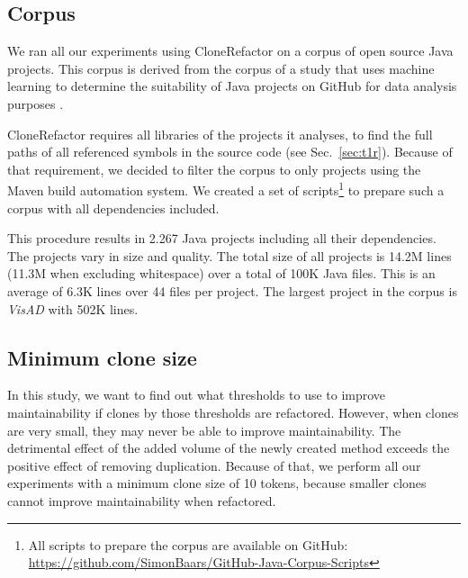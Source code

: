 \documentclass[sigconf,review, table]{acmart}
\begin{document}
\subsection{Corpus}
We ran all our experiments using CloneRefactor on a corpus of open source Java projects. This corpus is derived from the corpus of a study that uses machine learning to determine the suitability of Java projects on GitHub for data analysis purposes \cite{githubCorpus2013}.

CloneRefactor requires all libraries of the projects it analyses, to find the full paths of all referenced symbols in the source code (see Sec.~\ref{sec:t1r}). Because of that requirement, we decided to filter the corpus to only projects using the Maven build automation system. We created a set of scripts\footnote{All scripts to prepare the corpus are available on GitHub: \url{https://github.com/SimonBaars/GitHub-Java-Corpus-Scripts}} to prepare such a corpus with all dependencies included.

This procedure results in 2.267 Java projects including all their dependencies. The projects vary in size and quality. The total size of all projects is 14.2M lines (11.3M when excluding whitespace) over a total of 100K Java files. This is an average of 6.3K lines over 44 files per project. The largest project in the corpus is \textit{VisAD} with 502K lines.

\subsection{Minimum clone size}
In this study, we want to find out what thresholds to use to improve maintainability if clones by those thresholds are refactored. However, when clones are very small, they may never be able to improve maintainability. The detrimental effect of the added volume of the newly created method exceeds the positive effect of removing duplication. Because of that, we perform all our experiments with a minimum clone size of 10 tokens, because smaller clones cannot improve maintainability when refactored.
\end{document}
